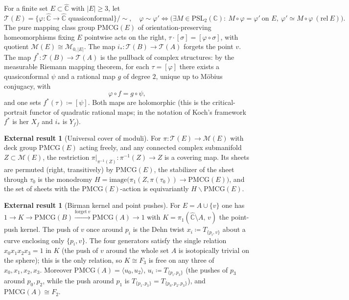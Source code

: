\documentclass[11pt]{article}
\theoremstyle{definition}
\newtheorem{quoted}[theorem]{External result}
\theoremstyle{remark}
\newcommand{\Teich}{\mathcal T}
\newcommand{\MM}{\mathcal M}
\newcommand{\PMCG}{\mathrm{PMCG}}
\newcommand{\Chat}{\widehat{\mathbb C}}
\begin{document}
For a finite set $E\subset\Chat$ with $|E|\ge3$, let
\[
\Teich(E)=\{\varphi:\Chat\to\Chat\text{ quasiconformal}\}/{\sim},
\quad
\varphi\sim\varphi'\iff
\bigl(\exists M\in\mathrm{PSL}_2(\mathbb C):\ M\circ\varphi=\varphi'\
\text{on }E,\ \varphi'\simeq M\circ\varphi\ (\mathrm{rel}\ E)\bigr).
\]
The pure mapping class group $\PMCG(E)$ of orientation-preserving
homeomorphisms fixing $E$ pointwise acts on the right,
$\tau\cdot[\sigma]=[\varphi\circ\sigma]$, with quotient
$\MM(E)\cong\MM_{0,|E|}$.
The map $i_*:\Teich(B)\to\Teich(A)$ forgets the point $v$.
The map $f^*:\Teich(B)\to\Teich(A)$ is the pullback of complex
structures: by the measurable Riemann mapping theorem, for each
$\tau=[\varphi]$ there exists a quasiconformal $\psi$ and a rational
map $g$ of degree $2$, unique up to M\"obius conjugacy, with
\begin{equation}\label{eq:pullback}
\varphi\circ f=g\circ\psi,
\end{equation}
and one sets $f^*(\tau)\coloneqq[\psi]$.  Both maps are holomorphic
(this is the critical-portrait functor of quadratic rational maps;
in the notation of Koch's framework $f^*$ is her $X_f$ and $i_*$ is
$Y_f$).

\begin{quoted}[Universal cover of moduli]\label{q:uc}
For $\pi:\Teich(E)\to\MM(E)$ with deck group $\PMCG(E)$ acting freely,
and any connected complex submanifold $Z\subset\MM(E)$, the
restriction $\pi|_{\pi^{-1}(Z)}:\pi^{-1}(Z)\to Z$ is a covering map.
Its sheets are permuted (right, transitively) by $\PMCG(E)$, the
stabilizer of the sheet through $\tau_0$ is the monodromy
$H=\mathrm{image}\bigl(\pi_1(Z,\pi(\tau_0))\to\PMCG(E)\bigr)$, and the
set of sheets with the $\PMCG(E)$-action is
equivariantly $H\backslash\PMCG(E)$.
\end{quoted}

\begin{quoted}[Birman kernel and point pushes]\label{q:birman}
For $E=A\cup\{v\}$ one has
$1\to K\to\PMCG(B)\xrightarrow{\mathrm{forget}\ v}\PMCG(A)\to1$ with
$K=\pi_1(\Chat\setminus A,\,v)$ the point-push kernel.  The push of $v$
once around $p_i$ is the Dehn twist $x_i\coloneqq T_{\{p_i,v\}}$ about
a curve enclosing only $\{p_i,v\}$.  The four generators satisfy the
single relation $x_0x_1x_2x_3=1$ in $K$ \textup{(}the push of $v$ around
the whole set $A$ is isotopically trivial on the sphere\textup{)}; this
is the only relation, so $K\cong F_3$ is free on any three of
$x_0,x_1,x_2,x_3$.  Moreover
$\PMCG(A)=\langle u_0,u_2\rangle$, $u_i\coloneqq T_{\{p_i,p_3\}}$
(the pushes of $p_3$ around $p_0,p_2$, while the push around $p_1$ is
$T_{\{p_1,p_3\}}=T_{\{p_0,p_2,p_3\}}$), and $\PMCG(A)\cong F_2$.
\end{quoted}
\end{document}
